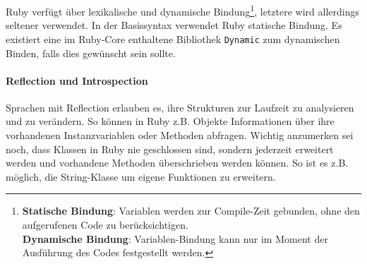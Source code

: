 Ruby verfügt über lexikalische und dynamische Bindung\footnote{
\textbf{Statische Bindung}: Variablen werden zur Compile-Zeit gebunden, ohne den aufgerufenen Code zu berücksichtigen.\\
\textbf{Dynamische Bindung}: Variablen-Bindung kann nur im Moment der Ausführung des Codes festgestellt werden.}, letztere wird allerdings seltener verwendet. In der Basissyntax verwendet Ruby statische Bindung. Es existiert eine im Ruby-Core enthaltene Bibliothek \texttt{Dynamic} zum dynamischen Binden, falls dies gewünscht sein sollte.


\paragraph{Reflection und Introspection} Sprachen mit Reflection erlauben es, ihre Strukturen zur Laufzeit zu analysieren und zu verändern. So können in Ruby z.B. Objekte Informationen über ihre vorhandenen Instanzvariablen oder Methoden abfragen. Wichtig anzumerken sei noch, dass Klassen in Ruby nie geschlossen sind, sondern jederzeit erweitert werden und vorhandene Methoden überschrieben werden können. So ist es z.B. möglich, die String-Klasse um eigene Funktionen zu erweitern.

%
%
%
\begin{ruby}[label=IRB]
 
   
     
  

\end{ruby}

